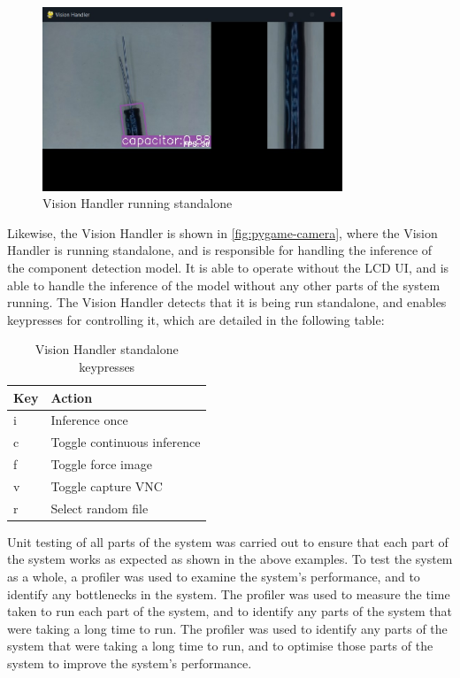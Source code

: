 \begin{figure}[H]
  \centering
  \includegraphics[width=0.8\textwidth]{imgs/software/visionhandler.jpg}
  \caption{Vision Handler running standalone}
  \label{fig:pygame-camera}
\end{figure}

Likewise, the Vision Handler is shown in \autoref{fig:pygame-camera}, where the Vision Handler is running standalone, and is responsible for handling the inference of the component detection model. It is able to operate without the LCD UI, and is able to handle the inference of the model without any other parts of the system running. The Vision Handler detects that it is being run standalone, and enables keypresses for controlling it, which are detailed in the following table:

\begin{table}[H]
  \centering
  \begin{tabularx}{\textwidth}{|X|X|}
    \hline
    \textbf{Key} & \textbf{Action} \\
    \hline
    i & Inference once \\
    \hline
    c & Toggle continuous inference \\
    \hline
    f & Toggle force image \\
    \hline
    v & Toggle capture VNC \\
    \hline
    r & Select random file \\
    \hline
  \end{tabularx}
  \caption{Vision Handler standalone keypresses}
  \label{tab:vision-handler-keypresses}
\end{table}

Unit testing of all parts of the system was carried out to ensure that each part of the system works as expected as shown in the above examples. To test the system as a whole, a profiler was used to examine the system's performance, and to identify any bottlenecks in the system. The profiler was used to measure the time taken to run each part of the system, and to identify any parts of the system that were taking a long time to run. The profiler was used to identify any parts of the system that were taking a long time to run, and to optimise those parts of the system to improve the system's performance.

